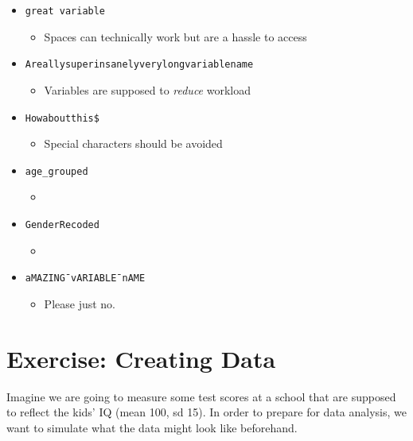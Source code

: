 \documentclass[
]{book}
\providecommand{\tightlist}{%
  \setlength{\itemsep}{0pt}\setlength{\parskip}{0pt}}
\begin{document}
\begin{itemize}
\tightlist
\item
  \texttt{great\ variable}

  \begin{itemize}
  \tightlist
  \item
    Spaces can technically work but are a hassle to access
  \end{itemize}
\item
  \texttt{Areallysuperinsanelyverylongvariablename}

  \begin{itemize}
  \tightlist
  \item
    Variables are supposed to \emph{reduce} workload
  \end{itemize}
\item
  \texttt{Howaboutthis\$}

  \begin{itemize}
  \tightlist
  \item
    Special characters should be avoided
  \end{itemize}
\item
  \texttt{age\_grouped}

  \begin{itemize}
  \tightlist
  \item
  \end{itemize}
\item
  \texttt{GenderRecoded}

  \begin{itemize}
  \tightlist
  \item
  \end{itemize}
\item
  \texttt{aMAZING¯vARIABLE¯nAME}

  \begin{itemize}
  \tightlist
  \item
    Please just no.
  \end{itemize}
\end{itemize}

\section{Exercise: Creating Data}\label{exercise-creating-data}

Imagine we are going to measure some test scores at a school that are supposed to reflect the kids' IQ (mean 100, sd 15).
In order to prepare for data analysis, we want to simulate what the data might look like beforehand.
\end{document}
